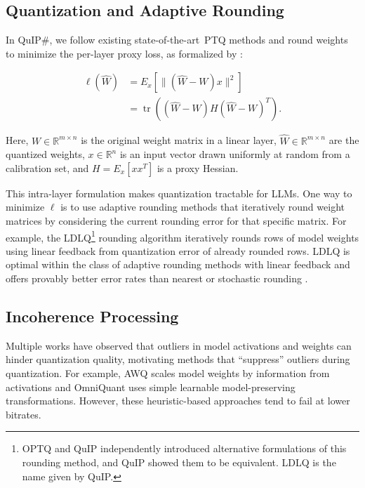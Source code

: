 \subsection{Quantization and Adaptive Rounding}
\label{sec:quantbg}
In QuIP$\#$, we follow existing state-of-the-art\  PTQ methods and round weights to minimize the per-layer proxy loss, as formalized by \citet{nagelround}:

\begin{align}
\label{eq:round_proxy}
\ell(\hat W) &= E_x \left[ \| (\hat W - W)x \|^2 \right] \\
  &= \operatorname{tr}\left((\hat W - W) H (\hat W - W)^T\right) .
\label{eqn:proxy}
\end{align}

Here, $W \in \mathbb{R}^{m \times n}$ is the original weight matrix in a linear layer, $\hat W \in \mathbb{R}^{m \times n}$ are the quantized weights, $x \in \mathbb{R}^n$ is an input vector drawn uniformly at random from a calibration set, and $H = E_x[xx^T]$ is a proxy Hessian.

This intra-layer formulation makes quantization tractable for LLMs. One way to minimize $\ell$ is to use adaptive rounding methods that iteratively round weight matrices by considering the current rounding error for that specific matrix. For example, the LDLQ\footnote{OPTQ \cite{optq} and QuIP independently introduced alternative formulations of this rounding method, and QuIP showed them to be equivalent. LDLQ is the name given by QuIP.} rounding algorithm iteratively rounds rows of model weights using linear feedback from quantization error of already rounded rows. LDLQ is optimal within the class of adaptive rounding methods with linear feedback and offers provably better error rates than nearest or stochastic rounding \cite{chee2023quip}.

\subsection{Incoherence Processing}
\label{sec:incpbg}

Multiple works have observed that outliers in model activations and weights can hinder quantization quality, motivating methods that ``suppress'' outliers during quantization. For example, AWQ \cite{awq} scales model weights by information from activations and OmniQuant \cite{omniquant} uses simple learnable model-preserving transformations. However, these heuristic-based approaches tend to fail at lower bitrates.

